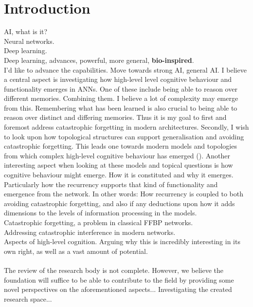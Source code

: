 
\chapter{Introduction}

AI, what is it?
\\
Neural networks.
\\
Deep learning.
\\
Deep learning, advances, powerful, more general, \textbf{bio-inspired}.
\\
I'd like to advance the capabilities. Move towards strong AI, general AI.
I believe a central aspect is investigating how high-level level cognitive behaviour and functionality emerges in ANNs.
One of these include being able to reason over different memories. Combining them. I believe a lot of complexity may emerge from this.
Remembering what has been learned is also crucial to being able to reason over distinct and differing memories.
Thus it is my goal to first and foremost address catastrophic forgetting in modern architectures.
Secondly, I wish to look upon how topological structures can support generalisation and avoiding catastrophic forgetting.
This leads one towards modern models and topologies from which complex high-level cognitive behaviour has emerged (\cite{Tani2014}).
Another interesting aspect when looking at these models and topical questions is how cognitive behaviour might emerge. How it is constituted and why it emerges. Particularly how the recurrency supports that kind of functionality and emergence from the network. In other words: How recurrency is coupled to both avoiding catastrophic forgetting, and also if any deductions upon how it adds dimensions to the levels of information processing in the models.
\\
Catastrophic forgetting, a problem in classical FFBP networks.
\\
Addressing catastrophic interference in modern networks.
\\
Aspects of high-level cognition. Arguing why this is incredibly interesting in its own right, as well as a vast amount of potential.
\\\\
The review of the research body is not complete. However, we believe the foundation will suffice to be able to contribute to the field by providing some novel perspectives on the aforementioned aspects... Investigating the created research space...
